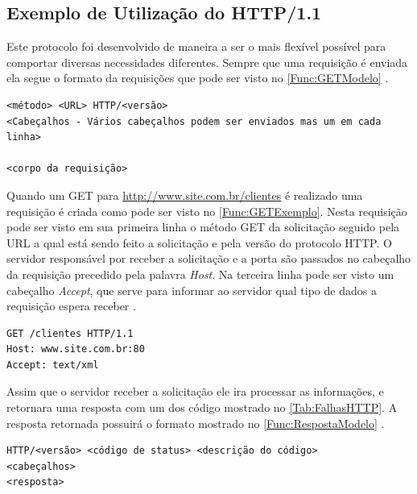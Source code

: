 \subsection{Exemplo de Utilização do HTTP/1.1} \label{subsec:ExemploHttp}

Este protocolo foi desenvolvido de maneira a ser o mais flexível possível para comportar diversas necessidades diferentes.
Sempre que uma requisição é enviada ela segue o formato da requisições que pode ser visto no \autoref{Func:GETModelo} \cite{Saudate:2014}.

\begin{lstlisting}[label=Func:GETModelo,caption={[Formato de uma requisição HTTP]Formato de uma requisição HTTP}]
<método> <URL> HTTP/<versão>
<Cabeçalhos - Vários cabeçalhos podem ser enviados mas um em cada linha>

<corpo da requisição> 
\end{lstlisting}


Quando um GET para \url{http://www.site.com.br/clientes} é realizado uma requisição é criada como pode ser visto no \autoref{Func:GETExemplo}. Nesta requisição pode ser visto em sua primeira linha o método GET da solicitação seguido pela URL a qual está sendo feito a solicitação e pela versão do protocolo HTTP. O servidor responsável por receber a solicitação e a porta são passados no cabeçalho da requisição precedido pela palavra \textit{Host}. Na terceira linha pode ser visto um cabeçalho \textit{Accept}, que serve para informar ao servidor qual tipo de dados a requisição espera receber \cite{Saudate:2014}.


\begin{lstlisting}[label=Func:GETExemplo,caption={[Exemplo de uma requisição HTTP utilizando o método GET.]Exemplo de uma solicitação HTTP utilizando o método GET, para \url{http://www.site.com.br/clientes} com o pedido de uma arquivo XML de resposta.}]
GET /clientes HTTP/1.1
Host: www.site.com.br:80
Accept: text/xml
\end{lstlisting}

Assim que o servidor receber a solicitação ele ira processar as informações, e retornara uma resposta com um dos código mostrado no \autoref{Tab:FalhasHTTP}. A resposta retornada possuirá o formato mostrado no \autoref{Func:RespostaModelo} \cite{Saudate:2014}.


\begin{lstlisting}[label=Func:RespostaModelo,caption={[Formato de uma resposta HTTP]Formato de uma resposta HTTP}]
HTTP/<versão> <código de status> <descrição do código>
<cabeçalhos>
<resposta>
\end{lstlisting}


